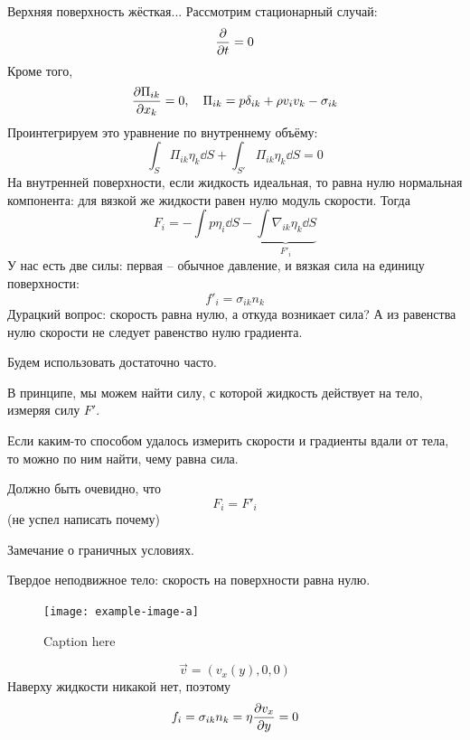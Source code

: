 Верхняя поверхность жёсткая... Рассмотрим стационарный случай:
\begin{equation}
    \pdv{t} = 0
\end{equation}
Кроме того,
\begin{equation}
    \pdv{\Pi_{ik}}{x_k} = 0,\quad
    \Pi_{ik} = p\delta_{ik}+\rho v_i v_k -\sigma_{ik}
\end{equation}
Проинтегрируем это уравнение по внутреннему объёму:
\begin{equation}
    \int_S \Pi_{ik} \eta_k \dd{S} + \int_{S'} \Pi_{ik} \eta_k \dd{S} = 0
\end{equation}
На внутренней поверхности, если жидкость идеальная, то равна нулю нормальная компонента: для вязкой же жидкости равен нулю модуль скорости. Тогда
\begin{equation}
    F_i = -\int p \eta_i \dd{S} - \underbrace{\int \nabla_{ik} \eta_k \dd{S}}_{F'_i}
\end{equation}
У нас есть две силы: первая -- обычное давление, и вязкая сила на единицу поверхности:
\begin{equation}
    f'_i = \sigma_{ik} n_k
\end{equation}
Дурацкий вопрос: скорость равна нулю, а откуда возникает сила? А из равенства нулю скорости не следует равенство нулю градиента.

Будем использовать достаточно часто.

В принципе, мы можем найти силу, с которой жидкость действует на тело, измеряя силу $F'$.

Если каким-то способом удалось измерить скорости и градиенты вдали от тела, то можно по ним найти, чему равна сила.

Должно быть очевидно, что
\begin{equation}
    F_i = F'_i
\end{equation}
(не успел написать почему)

Замечание о граничных условиях.

Твердое неподвижное тело: скорость на поверхности равна нулю.

\begin{figure}[h!]
    \centering
    \texttt{[image: example-image-a]}
    \caption{Caption here}
    \label{fig:figure1}
\end{figure}
\begin{equation}
    \vec{v}= (v_x (y),0,0)
\end{equation}
Наверху жидкости никакой нет, поэтому
\begin{equation}
    f_i = \sigma_{ik} n_k =
    \eta\pdv{v_x}{y} = 0
\end{equation}


